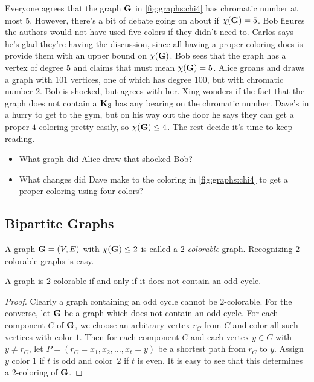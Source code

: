 \begin{discussion}
  Everyone agrees that the graph $\mathbf{G}$ in \autoref{fig:graphs:chi4}
  has chromatic number at most $5$. However, there's a bit of debate
  going on about if $\chi(\mathbf{G})=5$. Bob figures the authors would not
  have used five colors if they didn't need to. Carlos says he's glad
  they're having the discussion, since all having a proper coloring
  does is provide them with an upper bound on $\chi(\mathbf{G})$. Bob sees
  that the graph has a vertex of degree $5$ and claims that must mean
  $\chi(\mathbf{G})=5$. Alice groans and draws a graph with $101$ vertices,
  one of which has degree $100$, but with chromatic number $2$. Bob is
  shocked, but agrees with her. Xing wonders if the fact that the
  graph does not contain a $\mathbf{K}_3$ has any bearing on the chromatic
  number. Dave's in a hurry to get to the gym, but on his way out the
  door he says they can get a proper $4$-coloring pretty easily, so
  $\chi(\mathbf{G})\leq 4$. The rest decide it's time to keep reading.
 \begin{itemize}
  \item What graph did Alice draw that shocked Bob?
  \item What changes did Dave make to the coloring in
    \autoref{fig:graphs:chi4} to get a proper coloring using four
    colors?
  \end{itemize}
\end{discussion}

\subsection{Bipartite Graphs}

A graph $\mathbf{G}=(V,E)$ with $\chi(\mathbf{G})\le 2$ is called a $2$-\textit{colorable} graph. 
Recognizing $2$-colorable graphs is easy.

\begin{theorem}\label{thm:graphs:bipartite}
  A graph is $2$-colorable if and only if it does not contain an odd
  cycle.
\end{theorem}

\begin{proof}
  Clearly a graph containing an odd cycle cannot be $2$-colorable.
  For the converse, let $\mathbf{G}$ be a graph which does not contain
  an odd cycle.   For each component $C$ of $\mathbf{G}$, we choose
  an arbitrary vertex $r_C$ from $C$ and color all such vertices
  with color $1$.  Then for each component $C$ and each vertex
  $y\in C$ with $y\neq r_C$, let $P=(r_C=x_1,x_2,\dots,x_t=y)$ be
  a shortest path from $r_C$ to $y$.  Assign $y$ color $1$ if
  $t$ is odd and color~$2$ if $t$ is even.  It is easy to see that
  this determines a $2$-coloring of $\mathbf{G}$.
\end{proof}

